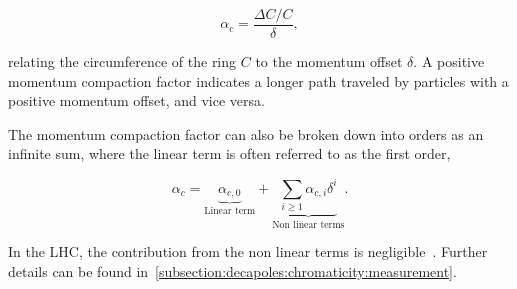 \begin{equation}
    \alpha_c = \frac{\Delta C / C}{\delta},
\end{equation}

relating the circumference of the ring $C$ to the momentum offset $\delta$.
A positive momentum compaction factor indicates a longer path traveled by particles with a positive
momentum offset, and vice versa.


The momentum compaction factor can also be broken down into orders as an infinite sum, where the
linear term is often referred to as the first order,

\begin{equation}
    \alpha_c = \underbrace{\alpha_{c,0}}_{\text{Linear term}}
               + \underbrace{\sum_{i \geq 1} \alpha_{c, i} \delta^i}_\text{Non linear terms}.
\end{equation}

In the LHC, the contribution from the non linear terms is
negligible~\cite{keintzel_jacqueline_beam_nodate}. Further details can be found
in~\cref{subsection:decapoles:chromaticity:measurement}.